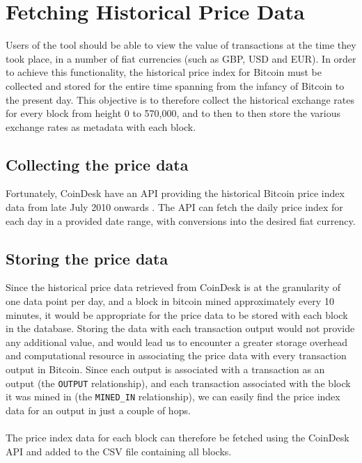 \section{Fetching Historical Price Data}\label{section-price-data}
Users of the tool should be able to view the value of transactions at the time they took place, in a number of fiat currencies (such as GBP, USD and EUR). In order to achieve this functionality, the historical price index for Bitcoin must be collected and stored for the entire time spanning from the infancy of Bitcoin to the present day. This objective is to therefore collect the historical exchange rates for every block from height 0 to 570,000, and to then to then store the various exchange rates as metadata with each block. 

\subsection{Collecting the price data}
Fortunately, CoinDesk have an API providing the historical Bitcoin price index data from late July 2010 onwards \cite{RefWorks:doc:5cacd8cbe4b092e311880f2b}. The API can fetch the daily price index for each day in a provided date range, with conversions into the desired fiat currency. 

\subsection{Storing the price data}
Since the historical price data retrieved from CoinDesk is at the granularity of one data point per day, and a block in bitcoin mined approximately every 10 minutes, it would be appropriate for the price data to be stored with each block in the database. Storing the data with each transaction output would not provide any additional value, and would lead us to encounter a greater storage overhead and computational resource in associating the price data with every transaction output in Bitcoin. Since each output is associated with a transaction as an output (the \texttt{OUTPUT} relationship), and each transaction associated with the block it was mined in (the \texttt{MINED\_IN} relationship), we can easily find the price index data for an output in just a couple of hops. 
\\\\
The price index data for each block can therefore be fetched using the CoinDesk API and added to the CSV file containing all blocks.

